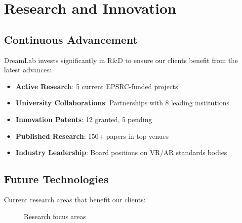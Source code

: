 \section{Research and Innovation}

\subsection{Continuous Advancement}

DreamLab invests significantly in R\&D to ensure our clients benefit from the latest advances:

\begin{itemize}
    \item \textbf{Active Research}: 5 current EPSRC-funded projects
    \item \textbf{University Collaborations}: Partnerships with 8 leading institutions
    \item \textbf{Innovation Patents}: 12 granted, 5 pending
    \item \textbf{Published Research}: 150+ papers in top venues
    \item \textbf{Industry Leadership}: Board positions on VR/AR standards bodies
\end{itemize}

\subsection{Future Technologies}

Current research areas that benefit our clients:

\begin{figure}[H]
\centering
{}
\caption{Research focus areas}
\end{figure}

